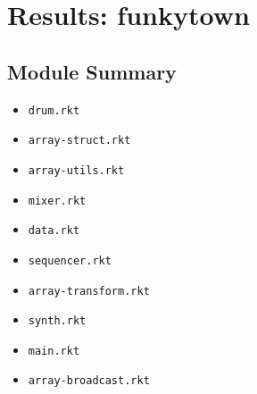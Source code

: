 \documentclass{article}
\newcommand{\mono}[1]{\texttt{#1}}
\begin{document}
\section{Results: funkytown}

\subsection{Module Summary}
\begin{itemize}
\item \mono{drum.rkt}
\item \mono{array-struct.rkt}
\item \mono{array-utils.rkt}
\item \mono{mixer.rkt}
\item \mono{data.rkt}
\item \mono{sequencer.rkt}
\item \mono{array-transform.rkt}
\item \mono{synth.rkt}
\item \mono{main.rkt}
\item \mono{array-broadcast.rkt}\end{itemize}
\end{document}
